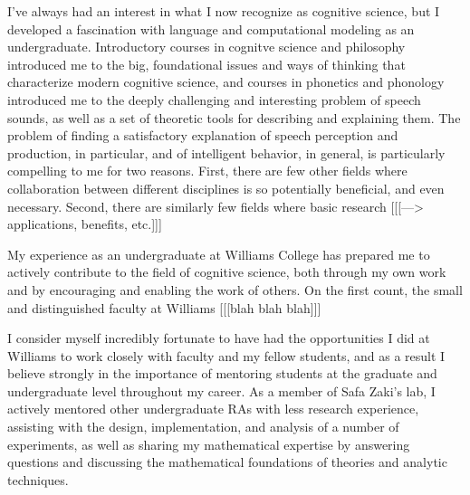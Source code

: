 \documentclass[12pt]{article}
\begin{document}

I've always had an interest in what I now recognize as cognitive science, but I developed a fascination with language and computational modeling as an undergraduate.  Introductory courses in cognitve science and philosophy introduced me to the big, foundational issues and ways of thinking that characterize modern cognitive science, and courses in phonetics and phonology introduced me to the deeply challenging and interesting problem of speech sounds, as well as a set of theoretic tools for describing and explaining them.  The problem of finding a satisfactory explanation of speech perception and production, in particular, and of intelligent behavior, in general, is particularly compelling to me for two reasons.  First, there are few other fields where collaboration between different disciplines is so potentially beneficial, and even necessary.  Second, there are similarly few fields where basic research [[[---> applications, benefits, etc.]]]


My experience as an undergraduate at Williams College has prepared me to actively contribute to the field of cognitive science, both through my own work and by encouraging and enabling the work of others.  On the first count, the small and distinguished faculty at Williams [[[blah blah blah]]]


I consider myself incredibly fortunate to have had the opportunities I did at Williams to work closely with faculty and my fellow students, and as a result I believe strongly in the importance of mentoring students at the graduate and undergraduate level throughout my career.  As a member of Safa Zaki's lab, I actively mentored other undergraduate RAs with less research experience, assisting with the design, implementation, and analysis of a number of experiments, as well as sharing my mathematical expertise by answering questions and discussing the mathematical foundations of theories and analytic techniques.

\end{document}
